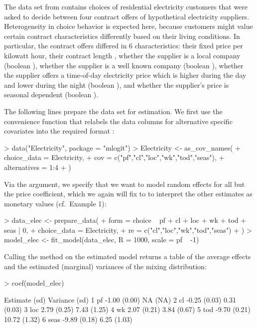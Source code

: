\documentclass[article,shortnames]{jss}
\newcommand{\fct}[1]{\code{#1()}}
\begin{document}
The  data set from  contains choices of residential electricity customers that were asked to decide between four contract offers of hypothetical electricity suppliers. Heterogeneity in choice behavior is expected here, because customers might value certain contract characteristics differently based on their living conditions. In particular, the contract offers differed in 6 characteristics: their fixed price  per kilowatt hour, their contract length , whether the supplier is a local company (boolean ), whether the supplier is a well known company (boolean ), whether the supplier offers a time-of-day electricity price which is higher during the day and lower during the night (boolean ), and whether the supplier's price is seasonal dependent (boolean ).

The following lines prepare the data set for estimation. We first use the convenience function \fct{as\_cov\_names} that relabels the data columns for alternative specific covariates into the required format :

\begin{Schunk}
\begin{Sinput}
> data("Electricity", package = "mlogit")
> Electricity <- as_cov_names(
+    choice_data = Electricity,
+    cov = c("pf","cl","loc","wk","tod","seas"),
+    alternatives = 1:4
+  )
\end{Sinput}
\end{Schunk}

Via the  argument, we specify that we want to model random effects for all but the price coefficient, which we again will fix to  to interpret the other estimates as monetary values (cf.\ Example 1):

\begin{Schunk}
\begin{Sinput}
> data_elec <- prepare_data(
+    form = choice ~ pf + cl + loc + wk + tod + seas | 0,
+    choice_data = Electricity,
+    re = c("cl","loc","wk","tod","seas")
+  )
> model_elec <- fit_model(data_elec, R = 1000, scale = pf ~ -1)
\end{Sinput}
\end{Schunk}

Calling the \fct{coef} method on the estimated model returns a table of the average effects and the estimated (marginal) variances of the mixing distribution:

\begin{Schunk}
\begin{Sinput}
> coef(model_elec)
\end{Sinput}
\begin{Soutput}
        Estimate   (sd) Variance   (sd)
1   pf     -1.00 (0.00)       NA   (NA)
2   cl     -0.25 (0.03)     0.31 (0.03)
3  loc      2.79 (0.25)     7.43 (1.25)
4   wk      2.07 (0.21)     3.84 (0.67)
5  tod     -9.70 (0.21)    10.72 (1.32)
6 seas     -9.89 (0.18)     6.25 (1.03)
\end{Soutput}
\end{Schunk}
\end{document}

